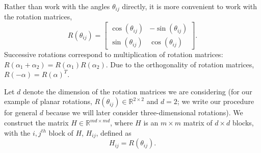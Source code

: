 \documentclass{pnastwo}
\begin{document}
\begin{article}
\begin{materials}
Rather than work with the angles $\theta_{ij}$ directly, it is more convenient to work with the rotation matrices, 
\begin{equation} \label{eq:R_theta}
R(\theta_{ij}) = \begin{bmatrix}
\cos(\theta_{ij}) & -\sin(\theta_{ij}) \\
\sin(\theta_{ij}) & \cos(\theta_{ij})
\end{bmatrix}.
\end{equation}
%
Successive rotations correspond to multiplication of rotation matrices: $R(\alpha_1 + \alpha_2) = R(\alpha_1) R(\alpha_2)$.
%
Due to the orthogonality of rotation matrices, $R(-\alpha) = R(\alpha)^T$.

Let $d$ denote the dimension of the rotation matrices we are considering (for our example of planar rotations, $R(\theta_{ij}) \in \mathbb{R}^{2 \times 2}$ and $d=2$; we write our procedure for general $d$ because we will later consider three-dimensional rotations).
%
We construct the matrix $H \in \mathbb{R}^{md \times md}$, where $H$ is an $m \times m$ matrix of $d \times d$ blocks, with the $i,j^{th}$ block of $H$, $H_{ij}$, defined as
\begin{equation} \label{eq:H_to_R}
H_{ij} = R(\theta_{ij}).
\end{equation}
%


\end{materials}
\end{article}
\end{document}
